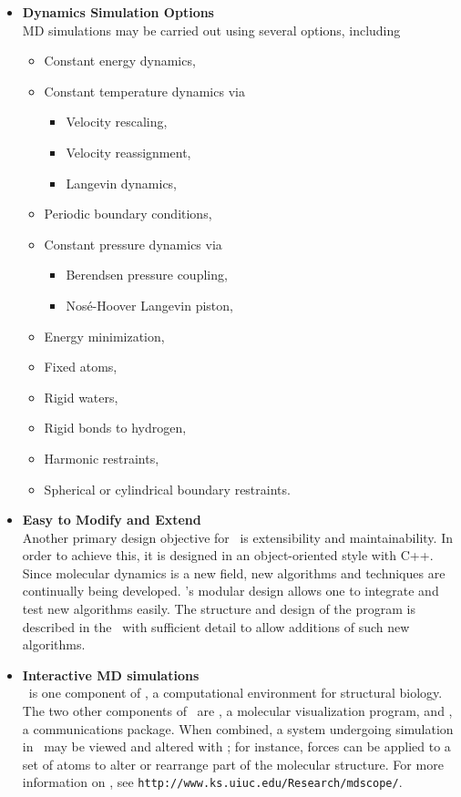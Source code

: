 \begin{itemize}
\item{\bf Dynamics Simulation Options}\\
MD simulations may be carried out using several options, including
\begin{itemize}
  \item Constant energy dynamics,
  \item Constant temperature dynamics via
  \begin{itemize}
    \item Velocity rescaling,
    \item Velocity reassignment,
    \item Langevin dynamics,
  \end{itemize}
  \item Periodic boundary conditions,
  \item Constant pressure dynamics via
  \begin{itemize}
    \item Berendsen pressure coupling,
    \item Nos\'{e}-Hoover Langevin piston,
  \end{itemize}
  \item Energy minimization,
  \item Fixed atoms,
  \item Rigid waters,
  \item Rigid bonds to hydrogen,
  \item Harmonic restraints,
  \item Spherical or cylindrical boundary restraints.
\end{itemize}

\item{\bf Easy to Modify and Extend}\\
Another primary design objective for \NAMD\ is extensibility and 
maintainability. In order to achieve this, it is designed in an 
object-oriented style with C++. Since molecular dynamics is a new field,
new algorithms and techniques are continually being developed.
\NAMD's modular design allows one to integrate and test new algorithms 
easily.  The structure and design of the program 
is described in the \PG\ with sufficient
detail to allow additions of such
new algorithms.

\item{\bf Interactive MD simulations}\\
\NAMD\ is one component of \ALLNAMES, a computational environment for
structural biology.  The two other components of \ALLNAMES\ are \VMD,
a molecular visualization program, and \MDCOMM, a communications package.
When combined, a system undergoing simulation in \NAMD\ may be viewed and
altered with \VMD; for instance, forces can be applied to a set of atoms
to alter or rearrange part of the molecular structure.  For more information
on \ALLNAMES, see {\tt http://www.ks.uiuc.edu/Research/mdscope/}.  


\end{itemize}
